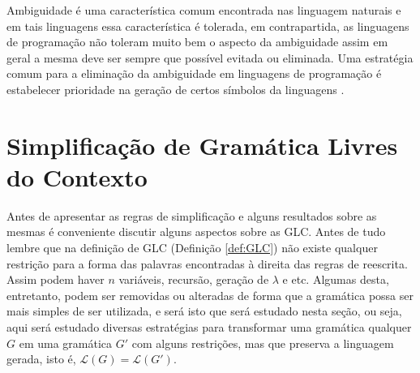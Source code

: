 Ambiguidade é uma característica comum encontrada nas linguagem naturais \cite{benjaLivro2010} e em tais linguagens essa característica é tolerada, em contrapartida, as linguagens de programação não toleram muito bem o aspecto da ambiguidade assim em geral a mesma deve ser sempre que possível evitada ou eliminada. Uma estratégia comum para a eliminação da ambiguidade em linguagens de programação é estabelecer prioridade na geração de certos símbolos da linguagens \cite{benjaLivro2010, aho2007}. 

\section{Simplificação de Gramática Livres do Contexto}\label{sec:SimplficacaoGLC}

Antes de apresentar as regras de simplificação e alguns resultados sobre as mesmas é conveniente discutir alguns aspectos sobre as GLC. Antes de tudo lembre que na definição de GLC (Definição \ref{def:GLC}) não existe qualquer restrição para a forma das palavras encontradas à direita das regras de reescrita. Assim podem haver $n$ variáveis, recursão, geração de $\lambda$ e etc. Algumas desta, entretanto, podem ser removidas ou alteradas de forma que a gramática possa ser mais simples de ser utilizada, e será isto que será estudado nesta seção, ou seja, aqui será estudado diversas estratégias para transformar uma gramática qualquer $G$ em uma gramática $G'$ com alguns restrições, mas que preserva a linguagem gerada, isto é, $\mathcal{L}(G) = \mathcal{L}(G')$. 